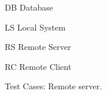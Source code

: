 \begin{table}[H]
\begin{threeparttable}
		\begin{tablenotes}
			\small
			\item[DB]Database
			\item[LS]Local System
			\item[RS]Remote Server
			\item[RC]Remote Client
		\end{tablenotes}
	\end{threeparttable}

	\caption{Test Cases: Remote server.}
	\label{table:test_rs}
\end{table}
